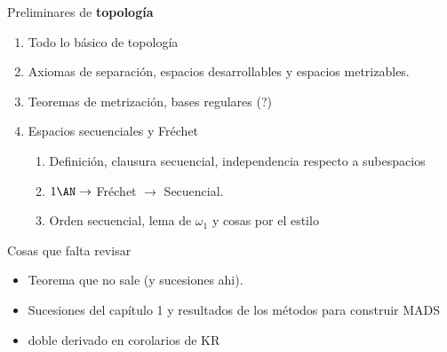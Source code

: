 \begin{flushright}
	Preliminares de \textbf{topología}
\end{flushright}
\begin{enumerate}
	\item Todo lo básico de topología

	\item Axiomas de separación, espacios desarrollables y espacios metrizables.

	\item Teoremas de metrización, bases regulares (?)

	\item Espacios secuenciales y Fréchet
	      \begin{enumerate}
		      \item Definición, clausura secuencial, independencia respecto a subespacios
		      \item $1 \AN \to $ Fréchet $\to$ Secuencial.
		      \item Orden secuencial, lema de $\omega_1$ y cosas por el estilo
	      \end{enumerate}
\end{enumerate}

\begin{flushright}
	Cosas que falta revisar
\end{flushright}
\begin{itemize}
	\item Teorema que no sale (y sucesiones ahi).
	\item Sucesiones del capítulo 1 y resultados de los métodos para construir MADS
	\item doble derivado en corolarios de KR
\end{itemize}

